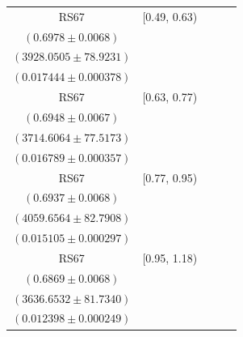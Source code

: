 {\begin{longtable}{|c|c|c|c|c|}
RS67 & [0.49, 0.63) & \begin{tabular}{@{}c@{}}$0.7504 \pm 0.0043$ \\ $(0.6978 \pm 0.0068)$\end{tabular} & \begin{tabular}{@{}c@{}}$3560.5734 \pm 72.3514$ \\ $(3928.0505 \pm 78.9231)$\end{tabular} & \begin{tabular}{@{}c@{}}$0.016939 \pm 0.000373$ \\ $(0.017444 \pm 0.000378)$\end{tabular} \\ \hline
RS67 & [0.63, 0.77) & \begin{tabular}{@{}c@{}}$0.7477 \pm 0.0043$ \\ $(0.6948 \pm 0.0067)$\end{tabular} & \begin{tabular}{@{}c@{}}$3391.7117 \pm 71.2736$ \\ $(3714.6064 \pm 77.5173)$\end{tabular} & \begin{tabular}{@{}c@{}}$0.015920 \pm 0.000348$ \\ $(0.016789 \pm 0.000357)$\end{tabular} \\ \hline
RS67 & [0.77, 0.95) & \begin{tabular}{@{}c@{}}$0.7448 \pm 0.0044$ \\ $(0.6937 \pm 0.0068)$\end{tabular} & \begin{tabular}{@{}c@{}}$3700.2820 \pm 76.2584$ \\ $(4059.6564 \pm 82.7908)$\end{tabular} & \begin{tabular}{@{}c@{}}$0.014951 \pm 0.000296$ \\ $(0.015105 \pm 0.000297)$\end{tabular} \\ \hline
RS67 & [0.95, 1.18) & \begin{tabular}{@{}c@{}}$0.7364 \pm 0.0046$ \\ $(0.6869 \pm 0.0068)$\end{tabular} & \begin{tabular}{@{}c@{}}$3320.0846 \pm 75.4220$ \\ $(3636.6532 \pm 81.7340)$\end{tabular} & \begin{tabular}{@{}c@{}}$0.012885 \pm 0.000254$ \\ $(0.012398 \pm 0.000249)$\end{tabular} \\ \hline

\end{longtable}}
